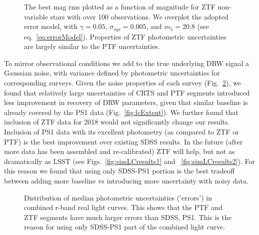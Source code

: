 \documentclass[twocolumn]{aastex62}
\begin{document}
\begin{figure}%
\caption{The best mag rms plotted as a function of magnitude for ZTF non-variable stars with over 100 observations. We overplot the adopted error model, with $\gamma = 0.05$, $\sigma_{sys} = 0.005 $, and $m_{5} = 20.8$ (see eq.~\ref{eq:errorModel}). Properties of ZTF photometric uncertainties are largely similar to the PTF uncertainties.}
\label{fig:ztf_errors}
\end{figure} 


To mirror observational conditions we add to the true underlying DRW signal a Gaussian noise, with variance defined by photometric uncertainties for corresponding surveys. Given the noise properties of each survey (Fig.~\ref{fig:combinedLCerrors}), we found that relatively large uncertainties of CRTS and PTF segments introduced less improvement in recovery of DRW parameters, given that similar baseline is already covered by the PS1 data (Fig.~\ref{fig:lcExtent}).  We further found that inclusion of ZTF data for 2018 would not significantly change our results. Inclusion of PS1 data with its excellent photometry (as compared to ZTF or PTF) is the best improvement over existing SDSS results.  In the future (after more data has been assembled and re-calibrated) ZTF will help, but not as dramatically as LSST (see Figs.~\ref{fig:simLCresults1} and ~\ref{fig:simLCresults2}).  For this reason we found that using only SDSS-PS1 portion is the best tradeoff between adding more baseline vs introducing more uncertainty with noisy data.

\begin{figure}%
\caption{Distribution of median photometric uncertainties ('errors') in combined r-band real light curves. This shows that the PTF and ZTF segments have much larger errors than SDSS, PS1. This is the reason for using only SDSS-PS1 part of the combined light curve.}
\label{fig:combinedLCerrors}
\end{figure} 

\end{document}

